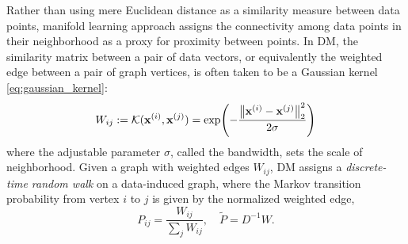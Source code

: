 Rather than using mere Euclidean distance as a similarity measure between data points, manifold learning approach assigns the connectivity among data points in their neighborhood as a proxy for proximity between points.
In DM, the similarity matrix between a pair of data vectors, or equivalently the weighted edge between a pair of graph vertices, is often taken to be a Gaussian kernel \cref{eq:gaussian_kernel}:
\begin{equation}
	W_{ij}:=\mathcal{K} (\vb{x}^{(i)},\vb{x}^{(j)}) =
	\exp(-\frac{\norm{\vb{x}^{(i)}-\vb{x}^{(j)}}_2^2}{2\sigma})
	\label{eq:diffusion_map_kernel}
\end{equation}
where the adjustable parameter $\sigma$, called the bandwidth, sets the scale of neighborhood.
Given a graph with weighted edges $W_{ij}$, DM assigns a \emph{discrete-time random walk} on a data-induced graph, 
where the Markov transition probability from vertex $i$ to $j$ is given by the normalized weighted edge,
\begin{equation}
	P_{ij} = \frac{W_{ij}}{\sum_{j}W_{ij}}
	,\quad
	\tilde{P} = D^{-1} W.
\end{equation}

